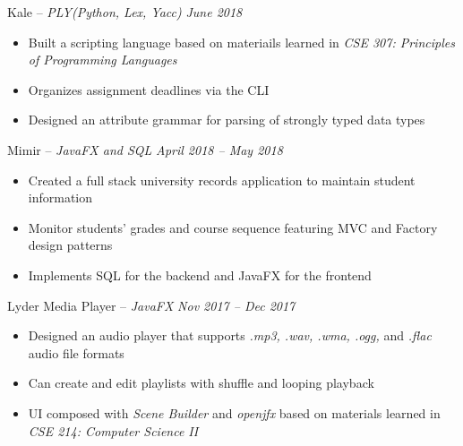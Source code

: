 \documentclass[10pt,letterpaper]{article} %
\begin{document}


\headedsection 
{Kale -- \textit{PLY(Python, Lex, Yacc)}}
{\textit{June 2018}} {
\begin{itemize}
	\setlength\itemsep{-0.3em}
	\item Built a scripting language based on materiails learned in \textit{CSE 307: Principles of Programming Languages}
	\item Organizes assignment deadlines via the CLI
	\item Designed an attribute grammar for parsing of strongly typed data types
\end{itemize}
}


\headedsection 
{Mimir -- \textit{JavaFX and SQL}}
{\textit{April 2018 -- May 2018}} {
\begin{itemize}
	\setlength\itemsep{-0.3em}
	\item Created a full stack university records application to maintain student information
	\item Monitor students' grades and course sequence featuring MVC and Factory design patterns
	\item Implements SQL for the backend and JavaFX for the frontend
\end{itemize}
}


\headedsection 
{Lyder Media Player -- \textit{JavaFX}}
{\textit{Nov 2017 -- Dec 2017}} {
\begin{itemize}
	\setlength\itemsep{-0.3em}
	\item Designed an audio player that supports \textit{.mp3, .wav, .wma, .ogg,} and \textit{.flac}  audio file formats
	\item Can create and edit playlists with shuffle and looping playback
	\item UI composed with \textit{Scene Builder} and \textit{openjfx} based on materials learned in \textit{CSE 214: Computer Science II}
\end{itemize}
}

\end{document}
